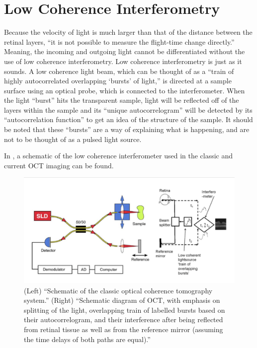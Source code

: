 \section{Low Coherence Interferometry}
Because the velocity of light is much larger than that of the
distance between the retinal layers, “it is not possible to
measure the flight-time change directly.” \cite{mbib_5} Meaning,
the incoming and outgoing light cannot be differentiated without
the use of low coherence interferometry. Low coherence interferometry
is just as it sounds.  A low coherence light beam, which can be thought
of as a “train of highly autocorrelated overlapping ‘bursts’ of light,”
is directed at a sample surface using an optical probe, which is connected
to the interferometer.\cite{mbib_4}  When the light “burst” hits the
transparent sample, light will be reflected off of the layers within
the sample and its “unique autocorrelogram” will be detected by its
“autocorrelation function” to get an idea of the structure of the sample.
\cite{mbib_4,mbib_3,mbib_6} It should be noted that these “bursts” are a
way of explaining what is happening, and are not to be thought of as a
pulsed light source.

In , a schematic of the low coherence interferometer used in the classic and current OCT imaging can be found.

\begin{figure}[htbp]
\centering
 \includegraphics{figures/morgan_1}
\caption{(Left) “Schematic of the classic optical coherence
tomography system.”  (Right) “Schematic diagram of OCT, with
emphasis on splitting of the light, overlapping train of labelled
bursts based on their autocorrelogram, and their interference
after being reflected from retinal tissue as well as from the
reference mirror (assuming the time delays of both paths are equal).” \cite{mbib_6,mbib_4} }
\label{fig:m_1}
\end{figure}


